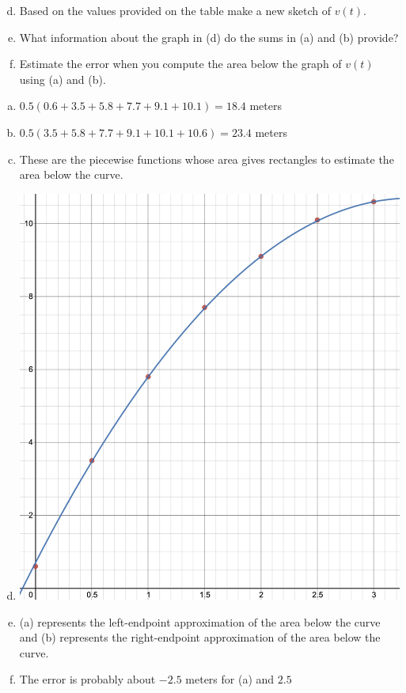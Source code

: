 \documentclass[11pt]{exam}
\begin{document}
\begin{questions}
\begin{enumerate}[(a)]
\setcounter{enumi}{3}
	\item Based on the values provided on the table make a new sketch of $v(t)$.
	\item What information about the graph in (d) do the sums in (a) and (b) provide?
	\item Estimate the error when you compute the area below the graph of $v(t)$ using (a) and (b).
\end{enumerate}
\begin{solution}
  \begin{enumerate}[(a)]
  \item \(0.5(0.6+3.5+5.8+7.7+9.1+10.1) = 18.4\) meters
  \item \(0.5(3.5+5.8+7.7+9.1+10.1+10.6) = 23.4\) meters
  \item These are the piecewise functions whose area gives rectangles
    to estimate the area below the curve.
  \item \includegraphics[scale=0.5]{1d}
  \item (a) represents the left-endpoint approximation of the area
    below the curve and (b)
    represents the right-endpoint approximation of the area below the curve.
  \item The error is probably about \(-2.5\) meters for (a) and \(2.5\)

\end{enumerate}
\end{solution}
\end{questions}
\end{document}
